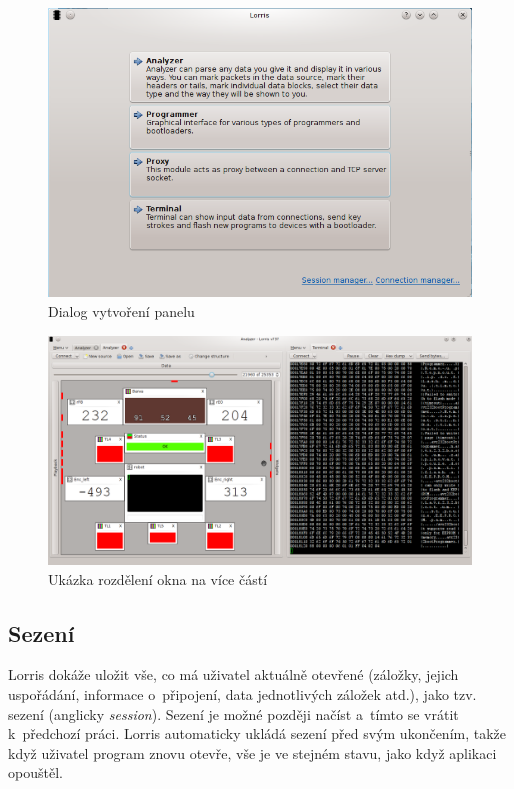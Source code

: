 \documentclass[12pt, a4paper, oneside]{article}
\newcommand{\It}{\textit}  %
\begin{document}
\begin{figure}[H]
\begin{center}
\includegraphics[scale=0.6]{img/new_tab.png}
\caption{Dialog vytvoření panelu}
\end{center}
\end{figure}

\begin{figure}[H]
\begin{center}
\includegraphics[width=\textwidth]{img/split.png}
\caption{Ukázka rozdělení okna na více částí}
\label{split_img}
\end{center}
\end{figure}

\subsection{Sezení}
Lorris dokáže uložit vše, co má uživatel aktuálně otevřené (záložky, jejich uspořádání, informace o~připojení, data jednotlivých záložek atd.), jako tzv. sezení (anglicky \It{session}). Sezení je možné později načíst a~tímto se vrátit k~předchozí práci. Lorris automaticky ukládá sezení před svým ukončením, takže když uživatel program znovu otevře, vše je ve stejném stavu, jako když aplikaci opouštěl.
\end{document}
